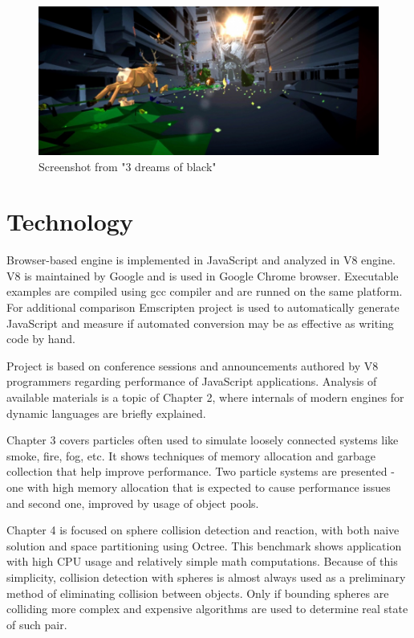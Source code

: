 \begin{figure}[h!]
  \caption{Screenshot from "3 dreams of black"}
  \label{img:rome}
  \centering
	\includegraphics[width=12cm]{summary/rome.jpg}
\end{figure}

\section{Technology}

Browser-based engine is implemented in JavaScript and analyzed in V8 engine. V8 is maintained by Google and is used in Google Chrome browser. Executable examples are compiled using gcc compiler and are runned on the same platform. For additional comparison Emscripten project is used to automatically generate JavaScript and measure if automated conversion may be as effective as writing code by hand.

Project is based on conference sessions and announcements authored by V8 programmers regarding performance of JavaScript applications. Analysis of available materials is a topic of Chapter 2, where internals of modern engines for dynamic languages are briefly explained.

Chapter 3 covers particles often used to simulate loosely connected systems like smoke, fire, fog, etc. It shows techniques of memory allocation and garbage collection that help improve performance. Two particle systems are presented - one with high memory allocation that is expected to cause performance issues and second one, improved by usage of object pools.

Chapter 4 is focused on sphere collision detection and reaction, with both naive solution and space partitioning using Octree. This benchmark shows application with high CPU usage and relatively simple math computations. Because of this simplicity, collision detection with spheres is almost always used as a preliminary method of eliminating collision between objects. Only if bounding spheres are colliding more complex and expensive algorithms are used to determine real state of such pair.


